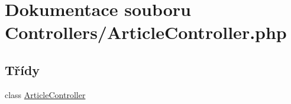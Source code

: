 \hypertarget{_article_controller_8php}{\section{Dokumentace souboru Controllers/\-Article\-Controller.php}
\label{_article_controller_8php}
}
\subsection*{Třídy}
\begin{DoxyCompactItemize}
\item 
class \hyperlink{class_article_controller}{Article\-Controller}
\end{DoxyCompactItemize}
